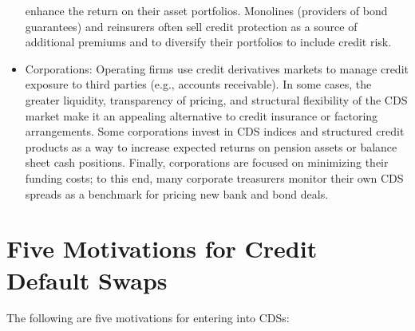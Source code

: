 \documentclass[11pt]{article}
\begin{document}
\begin{itemize}
enhance the return on their asset portfolios. Monolines (providers of bond guarantees) and reinsurers often sell credit protection as a source of additional premiums and to diversify their portfolios to include credit risk.
  \item Corporations: Operating firms use credit derivatives markets to manage credit exposure to third parties (e.g., accounts receivable). In some cases, the greater liquidity, transparency of pricing, and structural flexibility of the CDS market make it an appealing alternative to credit insurance or factoring arrangements. Some corporations invest in CDS indices and structured credit products as a way to increase expected returns on pension assets or balance sheet cash positions. Finally, corporations are focused on minimizing their funding costs; to this end, many corporate treasurers monitor their own CDS spreads as a benchmark for pricing new bank and bond deals.
\end{itemize}

\section*{Five Motivations for Credit Default Swaps}
The following are five motivations for entering into CDSs:
\end{document}
